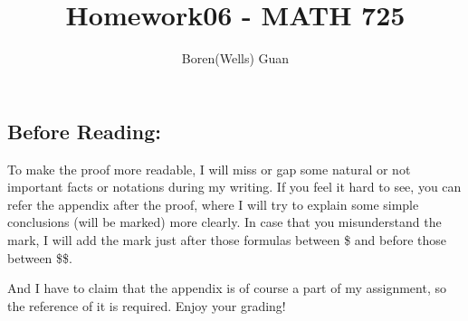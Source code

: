 \documentclass[lang=en,11pt,a4paper,citestyle =authoryear]{elegantpaper}
\title{Homework06 - MATH 725}
\author{Boren(Wells) Guan}
\begin{document}
\maketitle

\subsection*{Before Reading:}\par
To make the proof more readable, I will miss or gap some natural or not important facts or notations during my writing. If you feel it hard to see, you can refer the appendix after the proof, where I will try to explain some simple conclusions (will be marked) more clearly. In case that you misunderstand the mark, I will add the mark just after those formulas between \$ and before those between \$\$.\par
And I have to claim that the appendix is of course a part of my assignment, so the reference of it is required. Enjoy your grading!
\end{document}
